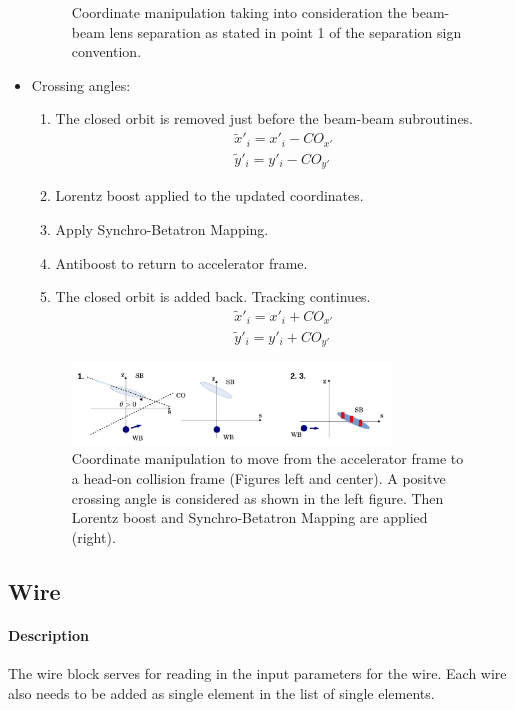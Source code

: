 \documentclass[a4paper,11pt]{report}
\begin{document}
\begin{itemize}
\begin{figure}[h]
\begin{center}
 \caption{Coordinate manipulation taking into consideration the beam-beam lens separation as stated in point 1 of the separation sign convention.}
 \label{fig:BB_sep}
 \end{center}
\end{figure}
 \item Crossing angles:
 \begin{enumerate}
  \item The closed orbit is removed just before the beam-beam subroutines.
  \begin{eqnarray*}
   \tilde x'_i=x'_i-CO_{x'} \\
   \tilde y'_i=y'_i-CO_{y'}
  \end{eqnarray*}
  \item Lorentz boost applied to the updated coordinates.
  \item Apply Synchro-Betatron Mapping.
  \item Antiboost to return to accelerator frame.
  \item The closed orbit is added back. Tracking continues.
  \begin{eqnarray*}
   \tilde x'_i=x'_i+CO_{x'} \\
   \tilde y'_i=y'_i+CO_{y'}
  \end{eqnarray*}
 \end{enumerate}
 \begin{figure}[h]
 \begin{center}
 \includegraphics[width=0.8\textwidth]{BB_xsing}
 \caption{Coordinate manipulation to move from the accelerator frame to a head-on collision frame (Figures left and center). A positve crossing angle is considered as shown in the left figure.
 Then Lorentz boost and Synchro-Betatron Mapping are applied (right).}
 \label{fig:BB_xsing}
 \end{center}
\end{figure}
\end{itemize}

\subsection{Wire} \label{sec:WIRE}

\paragraph{Description} The wire block serves for reading in the input parameters for the wire. Each wire also needs to be added as single element in the list of single elements.
\end{document}
